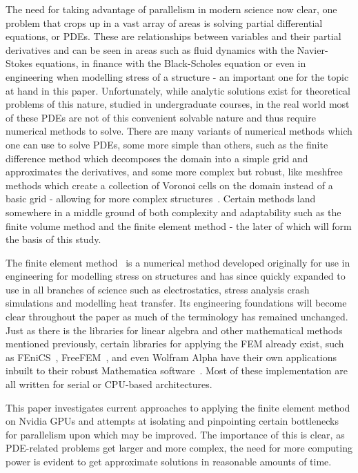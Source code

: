 The need for taking advantage of parallelism in modern science now clear, one problem that crops up in a vast array of areas is solving partial differential equations, or PDEs. These are relationships between variables and their partial derivatives and can be seen in areas such as fluid dynamics with the Navier-Stokes equations, in finance with the Black-Scholes equation or even in engineering when modelling stress of a structure - an important one for the topic at hand in this paper. Unfortunately, while analytic solutions exist for theoretical problems of this nature, studied in undergraduate courses, in the real world most of these PDEs are not of this convenient solvable nature and thus require numerical methods to solve. There are many variants of numerical methods which one can use to solve PDEs, some more simple than others, such as the finite difference method which decomposes the domain into a simple grid and approximates the derivatives, and some more complex but robust, like meshfree methods which create a collection of Voronoi cells on the domain instead of a basic grid - allowing for more complex structures~\cite{mfree}. Certain methods land somewhere in a middle ground of both complexity and adaptability such as the finite volume method and the finite element method - the later of which will form the basis of this study.

The finite element method~\cite{strang} is a numerical method developed originally for use in engineering for modelling stress on structures and has since quickly expanded to use in all branches of science such as electrostatics, stress analysis crash simulations and modelling heat transfer. Its engineering foundations will become clear throughout the paper as much of the terminology has remained unchanged. Just as there is the libraries for linear algebra and other mathematical methods mentioned previously, certain libraries for applying the FEM already exist, such as FEniCS~\cite{fenics}, FreeFEM~\cite{freefem}, and even Wolfram Alpha have their own applications inbuilt to their robust Mathematica software~\cite{walpha}. Most of these implementation are all written for serial or CPU-based architectures.

This paper investigates current approaches to applying the finite element method on Nvidia GPUs and attempts at isolating and pinpointing certain bottlenecks for parallelism upon which may be improved. The importance of this is clear, as PDE-related problems get larger and more complex, the  need for more computing power is evident to get approximate solutions in reasonable amounts of time.
